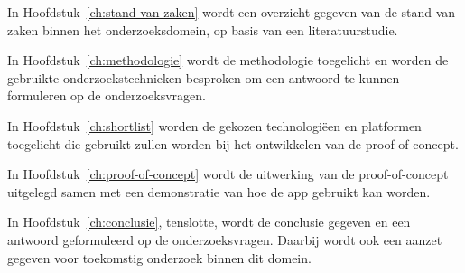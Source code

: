 In Hoofdstuk~\ref{ch:stand-van-zaken} wordt een overzicht gegeven van de stand van zaken binnen het onderzoeksdomein, op basis van een literatuurstudie.

In Hoofdstuk~\ref{ch:methodologie} wordt de methodologie toegelicht en worden de gebruikte onderzoekstechnieken besproken om een antwoord te kunnen formuleren op de onderzoeksvragen.

In Hoofdstuk~\ref{ch:shortlist} worden de gekozen technologi\"een en platformen toegelicht die gebruikt zullen worden bij het ontwikkelen van de proof-of-concept.

In Hoofdstuk~\ref{ch:proof-of-concept} wordt de uitwerking van de proof-of-concept uitgelegd samen met een demonstratie van hoe de app gebruikt kan worden.

In Hoofdstuk~\ref{ch:conclusie}, tenslotte, wordt de conclusie gegeven en een antwoord geformuleerd op de onderzoeksvragen.
Daarbij wordt ook een aanzet gegeven voor toekomstig onderzoek binnen dit domein.